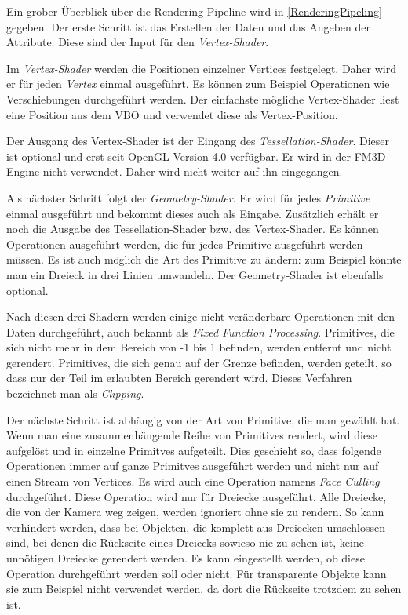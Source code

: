 Ein grober Überblick über die Rendering-Pipeline wird in \cref{RenderingPipeling} gegeben. Der erste Schritt ist das Erstellen der Daten und das Angeben der Attribute. Diese sind der Input für den \textit{Vertex-Shader}. 

Im \textit{Vertex-Shader} werden die Positionen einzelner Vertices festgelegt. Daher wird er für jeden \textit{Vertex} einmal ausgeführt. Es können zum Beispiel Operationen wie Verschiebungen durchgeführt werden. Der einfachste mögliche Vertex-Shader liest eine Position aus dem \ac{VBO} und verwendet diese als Vertex-Position. 

Der Ausgang des Vertex-Shader ist der Eingang des \textit{Tessellation-Shader}. Dieser ist optional und erst seit OpenGL-Version 4.0 verfügbar. Er wird in der FM3D-Engine nicht verwendet. Daher wird nicht weiter auf ihn eingegangen.

Als nächster Schritt folgt der \textit{Geometry-Shader}. Er wird für jedes \textit{Primitive} einmal ausgeführt und bekommt dieses auch als Eingabe. 
Zusätzlich erhält er noch die Ausgabe des Tessellation-Shader bzw. des Vertex-Shader. Es können Operationen ausgeführt werden, die für jedes Primitive ausgeführt werden müssen. Es ist auch möglich die Art des Primitive zu ändern: zum Beispiel könnte man ein Dreieck in drei Linien umwandeln. Der Geometry-Shader ist ebenfalls optional.

Nach diesen drei Shadern werden einige nicht veränderbare Operationen mit den Daten durchgeführt, auch bekannt als \textit{Fixed Function Processing}. 
Primitives, die sich nicht mehr in dem Bereich von -1 bis 1 befinden, werden entfernt und nicht gerendert. Primitives, die sich genau auf der Grenze befinden, werden geteilt, so dass nur der Teil im erlaubten Bereich gerendert wird. Dieses Verfahren bezeichnet man als \textit{Clipping}.

Der nächste Schritt ist abhängig von der Art von Primitive, die man gewählt hat. Wenn man eine zusammenhängende Reihe von Primitives rendert, wird diese aufgelöst und in einzelne Primitves aufgeteilt. Dies geschieht so, dass folgende Operationen immer auf ganze Primitves ausgeführt werden und nicht nur auf einen Stream von Vertices. 
Es wird auch eine Operation namens \textit{Face Culling} durchgeführt. Diese Operation wird nur für Dreiecke ausgeführt. Alle Dreiecke, die von der Kamera weg zeigen, werden ignoriert ohne sie zu rendern. 
So kann verhindert werden, dass bei Objekten, die komplett aus Dreiecken umschlossen sind, bei denen die Rückseite eines Dreiecks sowieso nie zu sehen ist, keine unnötigen Dreiecke gerendert werden. Es kann eingestellt werden, ob diese Operation durchgeführt werden soll oder nicht. Für transparente Objekte kann sie zum Beispiel nicht verwendet werden, da dort die Rückseite trotzdem zu sehen ist.

